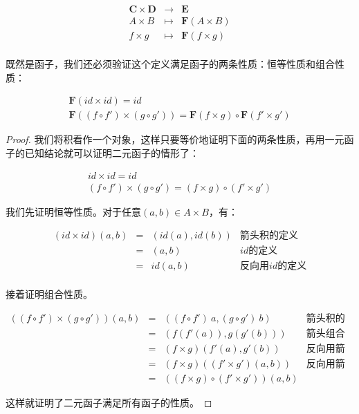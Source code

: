 \documentclass{article}
\begin{document}
\[
\begin{array}{rcl}
\pmb{C} \times \pmb{D} & \longrightarrow & \pmb{E} \\
A \times B & \longmapsto & \mathbf{F}(A \times B) \\
f \times g & \longmapsto & \mathbf{F}(f \times g) \\
\end{array}
\]

既然是函子，我们还必须验证这个定义满足函子的两条性质：恒等性质和组合性质：

\[
\begin{array}{l}
\mathbf{F}(id \times id) = id \\
\mathbf{F}((f \circ f') \times (g \circ g')) = \mathbf{F}(f \times g) \circ \mathbf{F} (f' \times g')
\end{array}
\]

\begin{proof}
我们将积看作一个对象，这样只要等价地证明下面的两条性质，再用一元函子的已知结论就可以证明二元函子的情形了：

\[
\begin{array}{l}
id \times id = id \\
(f \circ f') \times (g \circ g') = (f \times g) \circ (f' \times g')
\end{array}
\]

我们先证明恒等性质。对于任意$(a, b) \in A \times B$，有：

\[
\begin{array}{rcll}
(id \times id)(a, b) & = & (id(a), id(b)) & \text{箭头积的定义} \\
                     & = & (a, b) & \text{$id$的定义} \\
                     & = & id(a, b) & \text{反向用$id$的定义} \\
\end{array}
\]

接着证明组合性质。

\[
\begin{array}{rcll}
((f \circ f') \times (g \circ g'))(a, b) & = & ((f \circ f')\ a, (g \circ g')\ b) & \text{箭头积的定义} \\
    & = & (f(f'(a)), g(g'(b))) & \text{箭头组合的定义} \\
    & = & (f \times g)(f'(a), g'(b)) & \text{反向用箭头积的定义} \\
    & = & (f \times g)((f' \times g')(a, b)) & \text{反向用箭头积的定义} \\
    & = & ((f \times g) \circ (f' \times g'))(a, b)
\end{array}
\]

这样就证明了二元函子满足所有函子的性质。
\end{proof}
\end{document}
